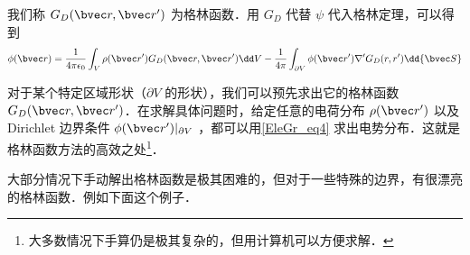 我们称 $G_D(\bvec r,\bvec r')$ 为格林函数．用 $G_D$ 代替 $\psi$ 代入格林定理，可以得到
\begin{equation}\label{EleGr_eq4}
\phi(\bvec r)=\frac{1}{4\pi\epsilon_0}\int_V \rho(\bvec r')G_D(\bvec r,\bvec r')\dd V-\frac{1}{4\pi}\int_{\partial V} \phi(\bvec r')\nabla'G_D(r,r')\dd {\bvec S}
\end{equation}

对于某个特定区域形状（$\partial V$ 的形状），我们可以预先求出它的格林函数 $G_D(\bvec r,\bvec r')$．在求解具体问题时，给定任意的电荷分布 $\rho(\bvec r')$ 以及 Dirichlet 边界条件 $\phi(\bvec r')|_{\partial V}$ ，都可以用\autoref{EleGr_eq4} 求出电势分布．这就是格林函数方法的高效之处\footnote{大多数情况下手算仍是极其复杂的，但用计算机可以方便求解．}．

大部分情况下手动解出格林函数是极其困难的，但对于一些特殊的边界，有很漂亮的格林函数．例如下面这个例子．

